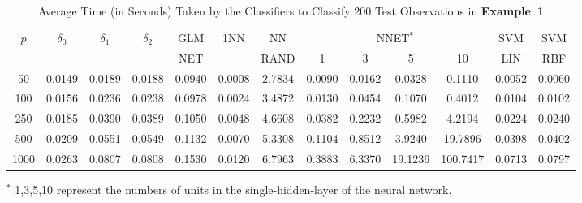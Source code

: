 \documentclass[twoside]{article}
\newcommand{\0}{\mathbf{0}}
\newcommand{\1}{\mathbf{1}}
\numberwithin{equation}{section}
\begin{document}
\begin{table}[H]
\caption{Average Time (in Seconds) Taken by the Classifiers to Classify 200 Test Observations in {\bf Example~1}}\label{tab4}
\centering\renewcommand{\arraystretch}{1.25}
\vspace{0.5cm}
\begin{adjustbox}{width=\columnwidth,center}
\begin{tabular}{|c|c|c|c|c|c|c|cccc|c|c|}
\hline
$p$ &  $\delta_0$&$\delta_1$& $\delta_2$& GLM & 1NN & NN & \multicolumn{4}{c|}{NNET$^*$} & SVM & SVM\\
 & & & & NET & & RAND & 1&3&5&10 & LIN & RBF\\
\hline
50         & 0.0149  & 0.0189  & 0.0188  & 0.0940  & 0.0008 & 2.7834   & 0.0090    & 0.0162  & 0.0328   & 0.1110    & 0.0052   & 0.0060    \\ \hline
100        & 0.0156  & 0.0236  & 0.0238  & 0.0978 & 0.0024 & 3.4872   & 0.0130    & 0.0454  & 0.1070    & 0.4012   & 0.0104   & 0.0102   \\ \hline
250        & 0.0185  & 0.0390   & 0.0389  & 0.1050  & 0.0048 & 4.6608   & 0.0382   & 0.2232  & 0.5982   & 4.2194   & 0.0224   & 0.0240    \\ \hline
500        & 0.0209  & 0.0551  & 0.0549  & 0.1132 & 0.0070  & 5.3308   & 0.1104   & 0.8512  & 3.9240    & 19.7896  & 0.0398   & 0.0402   \\ \hline
1000       & 0.0263  & 0.0807  & 0.0808  & 0.1530  & 0.0120  & 6.7963 & 0.3883 & 6.3370   & 19.1236 & 100.7417 & 0.0713 & 0.0797 \\ \hline
\end{tabular}
\end{adjustbox}
\end{table}
\vspace{-0.5cm}\footnotesize{$^*$ 1,3,5,10 represent the numbers of units in the single-hidden-layer of the neural network.}

\end{document}
